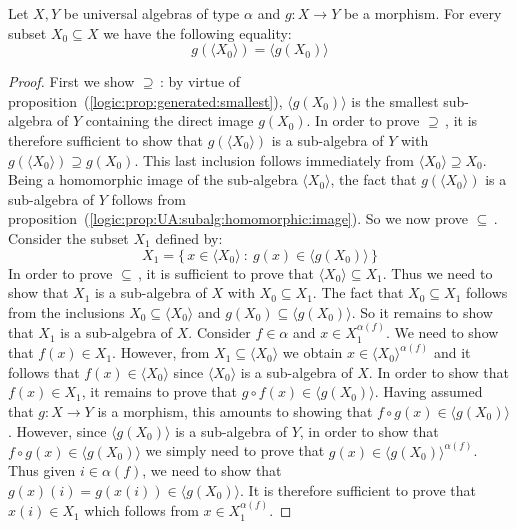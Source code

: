 \begin{prop}\label{logic:prop:UA:subalg:generated:direct:image}
Let $X,Y$ be universal algebras of type $\alpha$ and $g:X\to Y$ be a
morphism. For every subset $X_{0}\subseteq X$ we have the following
equality:
    \[
    g(\langle X_{0}\rangle)=\langle g(X_{0})\rangle
    \]
\end{prop}
\begin{proof}
First we show $\supseteq$\,: by virtue of
proposition~(\ref{logic:prop:generated:smallest}), $\langle
g(X_{0})\rangle$ is the smallest sub-algebra of $Y$ containing the
direct image $g(X_{0})$. In order to prove $\supseteq$\,, it is
therefore sufficient to show that $g(\langle X_{0}\rangle)$ is a
sub-algebra of $Y$ with $g(\langle X_{0}\rangle)\supseteq g(X_{0})$.
This last inclusion follows immediately from $\langle
X_{0}\rangle\supseteq X_{0}$. Being a homomorphic image of the
sub-algebra $\langle X_{0}\rangle$, the fact that $g(\langle
X_{0}\rangle)$ is a sub-algebra of $Y$ follows from
proposition~(\ref{logic:prop:UA:subalg:homomorphic:image}). So we
now prove $\subseteq$\,. Consider the subset $X_{1}$ defined by:
    \[
    X_{1}=\{\,x\in \langle X_{0}\rangle\ :\ g(x)\in\langle
    g(X_{0})\rangle\,\}
    \]
In order to prove $\subseteq$\,, it is sufficient to prove that
$\langle X_{0}\rangle\subseteq X_{1}$. Thus we need to show that
$X_{1}$ is a sub-algebra of $X$ with $X_{0}\subseteq X_{1}$. The
fact that $X_{0}\subseteq X_{1}$ follows from the inclusions
$X_{0}\subseteq\langle X_{0}\rangle$ and $g(X_{0})\subseteq\langle
g(X_{0})\rangle$. So it remains to show that $X_{1}$ is a
sub-algebra of $X$. Consider $f\in\alpha$ and $x\in
X_{1}^{\alpha(f)}$. We need to show that $f(x)\in X_{1}$. However,
from $X_{1}\subseteq \langle X_{0}\rangle$ we obtain $x\in\langle
X_{0}\rangle^{\alpha(f)}$ and it follows that $f(x)\in\langle
X_{0}\rangle$ since $\langle X_{0}\rangle$ is a sub-algebra of $X$.
In order to show that $f(x)\in X_{1}$, it remains to prove that
$g\circ f(x)\in\langle g(X_{0})\rangle$. Having assumed that $g:X\to
Y$ is a morphism, this amounts to showing that $f\circ
g(x)\in\langle g(X_{0})\rangle$. However, since $\langle
g(X_{0})\rangle$ is a sub-algebra of $Y$, in order to show that
$f\circ g(x)\in\langle g(X_{0})\rangle$ we simply need to prove that
$g(x)\in\langle g(X_{0})\rangle^{\alpha(f)}$. Thus given
$i\in\alpha(f)$, we need to show that $g(x)(i)=g(x(i))\in\langle
g(X_{0})\rangle$. It is therefore sufficient to prove that $x(i)\in
X_{1}$ which follows from $x\in X_{1}^{\alpha(f)}$.
\end{proof}

